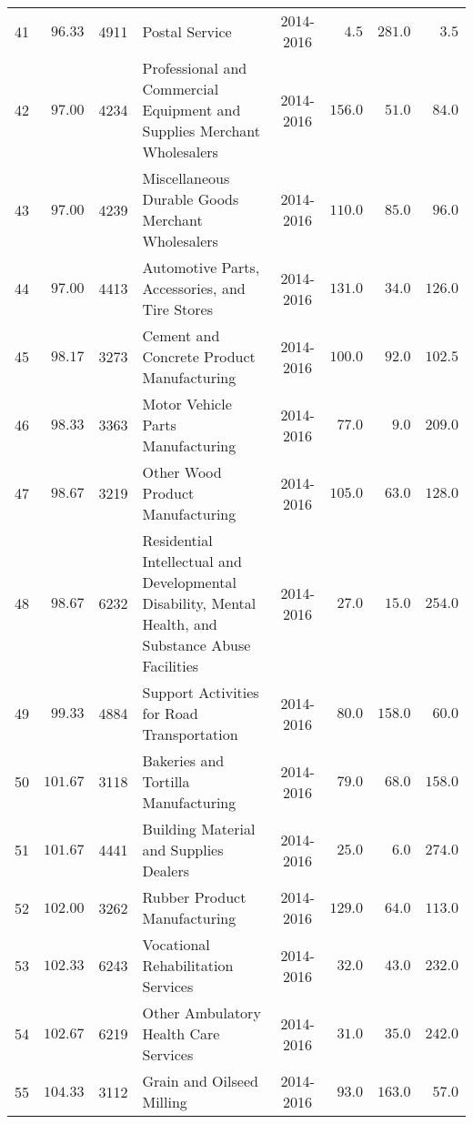 \documentclass[9pt, oneside]{article}   	%
\begin{document}
\begin{longtable}{cccp{2.0in}cccc}
41  & $\phantom{0}96.33$ & 4911 & Postal Service & 2014-2016 & $\phantom{00}4.5$ & $281.0$ & $\phantom{00}3.5$ \\
42  & $\phantom{0}97.00$ & 4234 & Professional and Commercial Equipment and Supplies Merchant Wholesalers & 2014-2016 & $156.0$ & $\phantom{0}51.0$ & $\phantom{0}84.0$ \\
43  & $\phantom{0}97.00$ & 4239 & Miscellaneous Durable Goods Merchant Wholesalers & 2014-2016 & $110.0$ & $\phantom{0}85.0$ & $\phantom{0}96.0$ \\
44  & $\phantom{0}97.00$ & 4413 & Automotive Parts, Accessories, and Tire Stores & 2014-2016 & $131.0$ & $\phantom{0}34.0$ & $126.0$ \\
45  & $\phantom{0}98.17$ & 3273 & Cement and Concrete Product Manufacturing & 2014-2016 & $100.0$ & $\phantom{0}92.0$ & $102.5$ \\
46  & $\phantom{0}98.33$ & 3363 & Motor Vehicle Parts Manufacturing & 2014-2016 & $\phantom{0}77.0$ & $\phantom{00}9.0$ & $209.0$ \\
47  & $\phantom{0}98.67$ & 3219 & Other Wood Product Manufacturing & 2014-2016 & $105.0$ & $\phantom{0}63.0$ & $128.0$ \\
48  & $\phantom{0}98.67$ & 6232 & Residential Intellectual and Developmental Disability, Mental Health, and Substance Abuse Facilities & 2014-2016 & $\phantom{0}27.0$ & $\phantom{0}15.0$ & $254.0$ \\
49  & $\phantom{0}99.33$ & 4884 & Support Activities for Road Transportation & 2014-2016 & $\phantom{0}80.0$ & $158.0$ & $\phantom{0}60.0$ \\
50  & $101.67$ & 3118 & Bakeries and Tortilla Manufacturing & 2014-2016 & $\phantom{0}79.0$ & $\phantom{0}68.0$ & $158.0$ \\
51  & $101.67$ & 4441 & Building Material and Supplies Dealers & 2014-2016 & $\phantom{0}25.0$ & $\phantom{00}6.0$ & $274.0$ \\
52  & $102.00$ & 3262 & Rubber Product Manufacturing & 2014-2016 & $129.0$ & $\phantom{0}64.0$ & $113.0$ \\
53  & $102.33$ & 6243 & Vocational Rehabilitation Services & 2014-2016 & $\phantom{0}32.0$ & $\phantom{0}43.0$ & $232.0$ \\
54  & $102.67$ & 6219 & Other Ambulatory Health Care Services & 2014-2016 & $\phantom{0}31.0$ & $\phantom{0}35.0$ & $242.0$ \\
55  & $104.33$ & 3112 & Grain and Oilseed Milling & 2014-2016 & $\phantom{0}93.0$ & $163.0$ & $\phantom{0}57.0$ \\

\end{longtable}
\end{document}

